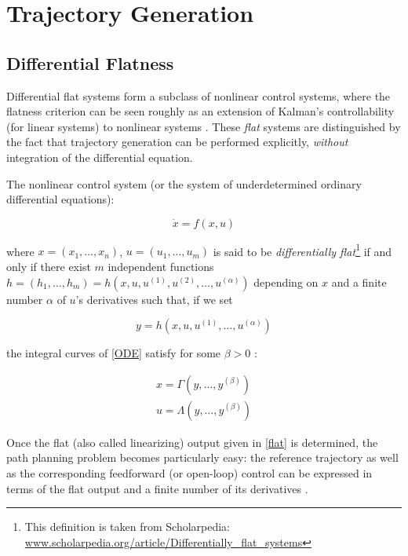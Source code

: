 \chapter{Trajectory Generation}\label{app:trjgen}

\section{Differential Flatness}

Differential flat systems form a subclass of nonlinear control systems, where the flatness criterion can be seen roughly as an extension of Kalman's controllability (for linear systems) to nonlinear systems \cite{Fliess95}. These \emph{flat} systems are distinguished by the fact that trajectory generation can be performed explicitly, \emph{without} integration of the differential equation.

The nonlinear control system (or the system of underdetermined ordinary differential equations):

\begin{equation}
\dot{x} = f(x, u)
\label{ODE}
\end{equation}

where $x = (x_1,\ldots, x_n)$, $u = (u_1, \ldots, u_m)$ is said to be \emph{differentially flat}\footnote{This definition is taken from Scholarpedia: \url{www.scholarpedia.org/article/Differentially\_flat\_systems}} if and only if there exist $m$ independent functions $h = (h_1, \ldots, h_m) = h(x, u, u^{(1)}, u^{(2)}, \ldots, u^{(\alpha)})$ depending on $x$ and a finite number $\alpha$ of $u$'s derivatives such that, if we set 

\begin{equation}
y = h(x, u, u^{(1)}, \ldots, u^{(\alpha)}) \label{flat}
\end{equation}

the integral curves of \eqref{ODE} satisfy for some $\beta > 0$ :

\begin{eqnarray}
x = \Gamma(y, \ldots, y^{(\beta)}) \\
u = \Lambda(y, \ldots, y^{(\beta)})
\end{eqnarray}

Once the flat (also called linearizing) output given in \eqref{flat} is determined, the path planning problem becomes particularly easy: the reference trajectory as well as the corresponding feedforward (or open-loop) control can be expressed in terms of the flat output and a finite number of its derivatives \cite{Fliess95}.

